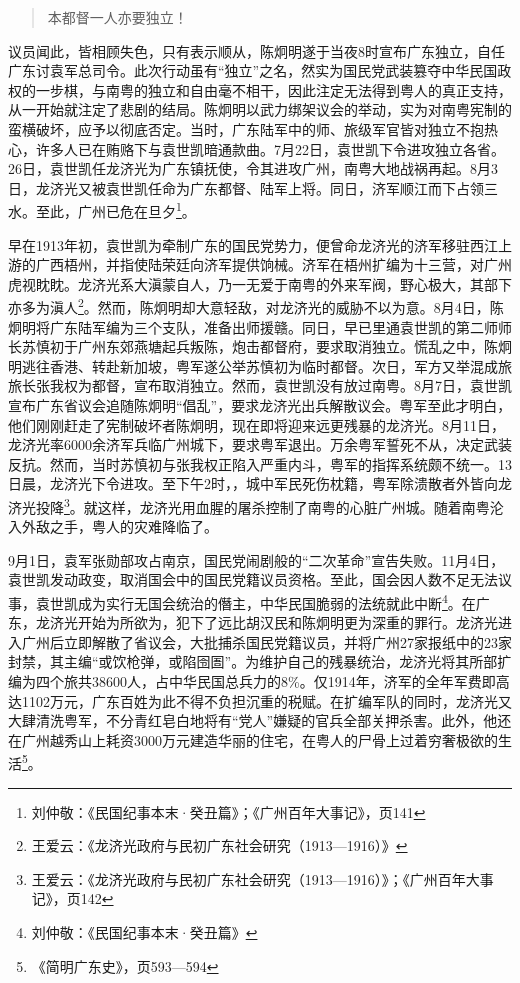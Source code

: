 \begin{quote}

本都督一人亦要独立！

\end{quote}

议员闻此，皆相顾失色，只有表示顺从，陈炯明遂于当夜8时宣布广东独立，自任广东讨袁军总司令。此次行动虽有“独立”之名，然实为国民党武装篡夺中华民国政权的一步棋，与南粤的独立和自由毫不相干，因此注定无法得到粤人的真正支持，从一开始就注定了悲剧的结局。陈炯明以武力绑架议会的举动，实为对南粤宪制的蛮横破坏，应予以彻底否定。当时，广东陆军中的师、旅级军官皆对独立不抱热心，许多人已在贿赂下与袁世凯暗通款曲。7月22日，袁世凯下令进攻独立各省。26日，袁世凯任龙济光为广东镇抚使，令其进攻广州，南粤大地战祸再起。8月3日，龙济光又被袁世凯任命为广东都督、陆军上将。同日，济军顺江而下占领三水。至此，广州已危在旦夕\footnote{刘仲敬：《民国纪事本末·癸丑篇》；《广州百年大事记》，页141}。

早在1913年初，袁世凯为牵制广东的国民党势力，便曾命龙济光的济军移驻西江上游的广西梧州，并指使陆荣廷向济军提供饷械。济军在梧州扩编为十三营，对广州虎视眈眈。龙济光系大滇蒙自人，乃一无爱于南粤的外来军阀，野心极大，其部下亦多为滇人\footnote{王爱云：《龙济光政府与民初广东社会研究（1913—1916）》}。然而，陈炯明却大意轻敌，对龙济光的威胁不以为意。8月4日，陈炯明将广东陆军编为三个支队，准备出师援赣。同日，早已里通袁世凯的第二师师长苏慎初于广州东郊燕塘起兵叛陈，炮击都督府，要求取消独立。慌乱之中，陈炯明逃往香港、转赴新加坡，粤军遂公举苏慎初为临时都督。次日，军方又举混成旅旅长张我权为都督，宣布取消独立。然而，袁世凯没有放过南粤。8月7日，袁世凯宣布广东省议会追随陈炯明“倡乱”，要求龙济光出兵解散议会。粤军至此才明白，他们刚刚赶走了宪制破坏者陈炯明，现在即将迎来远更残暴的龙济光。8月11日，龙济光率6000余济军兵临广州城下，要求粤军退出。万余粤军誓死不从，决定武装反抗。然而，当时苏慎初与张我权正陷入严重内斗，粤军的指挥系统颇不统一。13日晨，龙济光下令进攻。至下午2时，，城中军民死伤枕籍，粤军除溃散者外皆向龙济光投降\footnote{王爱云：《龙济光政府与民初广东社会研究（1913—1916）》；《广州百年大事记》，页142}。就这样，龙济光用血腥的屠杀控制了南粤的心脏广州城。随着南粤沦入外敌之手，粤人的灾难降临了。

9月1日，袁军张勋部攻占南京，国民党闹剧般的“二次革命”宣告失败。11月4日，袁世凯发动政变，取消国会中的国民党籍议员资格。至此，国会因人数不足无法议事，袁世凯成为实行无国会统治的僭主，中华民国脆弱的法统就此中断\footnote{刘仲敬：《民国纪事本末·癸丑篇》}。在广东，龙济光开始为所欲为，犯下了远比胡汉民和陈炯明更为深重的罪行。龙济光进入广州后立即解散了省议会，大批捕杀国民党籍议员，并将广州27家报纸中的23家封禁，其主编“或饮枪弹，或陷囹圄”。为维护自己的残暴统治，龙济光将其所部扩编为四个旅共38600人，占中华民国总兵力的8\%。仅1914年，济军的全年军费即高达1102万元，广东百姓为此不得不负担沉重的税赋。在扩编军队的同时，龙济光又大肆清洗粤军，不分青红皂白地将有“党人”嫌疑的官兵全部关押杀害。此外，他还在广州越秀山上耗资3000万元建造华丽的住宅，在粤人的尸骨上过着穷奢极欲的生活\footnote{《简明广东史》，页593—594}。

